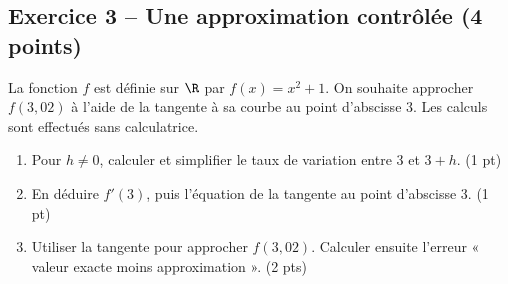 \subsection*{Exercice 3 -- Une approximation contrôlée (4 points)}
La fonction $f$ est définie sur $\R$ par $f(x)=x^2+1$. On souhaite approcher $f(3{,}02)$ à l’aide de la tangente à sa courbe au point d’abscisse 3. Les calculs sont effectués sans calculatrice.
\begin{enumerate}
\item Pour $h\ne0$, calculer et simplifier le taux de variation entre 3 et $3+h$. \hfill(1 pt)
\item En déduire $f\prime(3)$, puis l’équation de la tangente au point d’abscisse 3. \hfill(1 pt)
\item Utiliser la tangente pour approcher $f(3{,}02)$. Calculer ensuite l’erreur « valeur exacte moins approximation ». \hfill(2 pts)
\end{enumerate}
